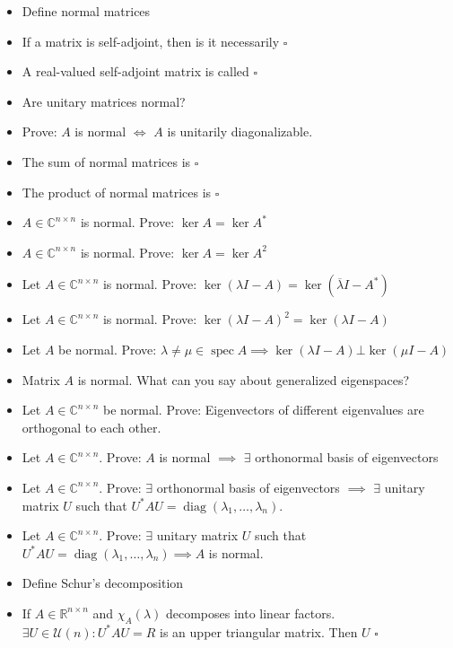 \documentclass[a4paper]{article}
\begin{document}
\begin{itemize}
  \item Define normal matrices
  \item If a matrix is self-adjoint, then is it necessarily $\square{}$
  \item A real-valued self-adjoint matrix is called $\square{}$
  \item Are unitary matrices normal?
  \item Prove: $A$ is normal $\iff$ $A$ is unitarily diagonalizable.
  \item The sum of normal matrices is $\square{}$
  \item The product of normal matrices is $\square{}$
  \item $A \in \mathbb C^{n \times n}$ is normal. Prove: $\ker{A} = \ker{A^*}$
  \item $A \in \mathbb C^{n \times n}$ is normal. Prove: $\ker{A} = \ker{A^2}$
  \item Let $A \in \mathbb C^{n \times n}$ is normal. Prove: $\ker(\lambda I - A) = \ker(\overline{\lambda} I - A^*)$
  \item Let $A \in \mathbb C^{n \times n}$ is normal. Prove: $\ker(\lambda I - A)^2 = \ker(\lambda I - A)$
  \item Let $A$ be normal. Prove: $\lambda \neq \mu \in \operatorname{spec}{A} \implies \ker(\lambda I - A) \bot \ker(\mu I - A)$
  \item Matrix $A$ is normal. What can you say about generalized eigenspaces?
  \item Let $A \in \mathbb C^{n \times n}$ be normal. Prove: Eigenvectors of different eigenvalues are orthogonal to each other.
  \item Let $A \in \mathbb C^{n \times n}$. Prove: $A$ is normal $\implies$ $\exists$ orthonormal basis of eigenvectors
  \item Let $A \in \mathbb C^{n \times n}$. Prove: $\exists$ orthonormal basis of eigenvectors $\implies$ $\exists$ unitary matrix $U$ such that $U^* AU = \operatorname{diag}(\lambda_1, \dots, \lambda_n)$.
  \item Let $A \in \mathbb C^{n \times n}$. Prove: $\exists$ unitary matrix $U$ such that $U^* AU = \operatorname{diag}(\lambda_1, \dots, \lambda_n) \implies A$ is normal.
  \item Define Schur's decomposition
  \item If $A \in \mathbb R^{n \times n}$ and $\chi_A(\lambda)$ decomposes into linear factors. $\exists U \in \mathcal U(n): U^* AU = R$ is an upper triangular matrix. Then $U$ $\square{}$

\end{itemize}
\end{document}
